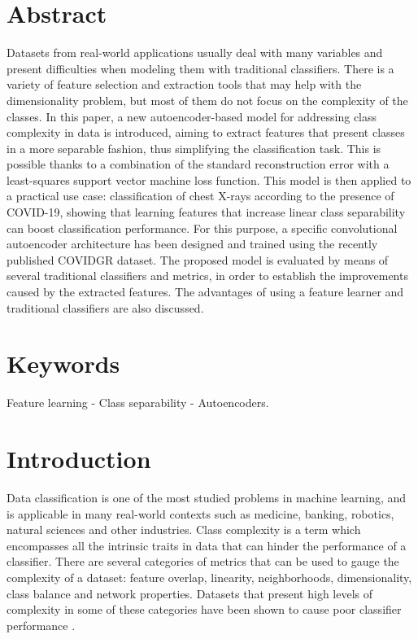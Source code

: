 \documentclass[
	fontsize=11pt, %
	twoside=false, %
	open=any, %
	secnumdepth=1, %
]{kaobook}
\begin{document}
\section*{Abstract} %
Datasets from real-world applications usually deal with many variables and present
difficulties when modeling them with traditional classifiers. There is a variety of feature
selection and extraction tools that may help with the dimensionality problem, but most of them
do not focus on the complexity of the classes. In this paper, a new autoencoder-based model
for addressing class complexity in data is introduced, aiming to extract features that present
classes in a more separable fashion, thus simplifying the classification task. This is possible thanks to a combination of the standard reconstruction error with a least-squares support vector machine loss function. This model is
then applied to a practical use case: classification of chest X-rays according to the presence
of COVID-19, showing that learning features that increase linear class separability can boost classification performance. For this purpose, a specific convolutional autoencoder architecture has been designed and trained using the recently published COVIDGR dataset. The proposed model is evaluated by means of several traditional classifiers and metrics, in order to establish the improvements caused by the extracted features. The advantages of using a feature learner and traditional classifiers are also discussed.
\section*{Keywords}Feature learning  - Class separability - Autoencoders.

\section{Introduction}\label{sec.intro}

Data classification \cite{Aggarwal2015} is one of the most studied problems in machine learning, and is applicable in many real-world contexts such as medicine, banking, robotics, natural sciences and other industries. Class complexity \cite{pascual2021revisiting,basu2006data} is a term which encompasses all the intrinsic traits in data that can hinder the performance of a classifier. There are several categories of metrics that can be used to gauge the complexity of a dataset: feature overlap, linearity, neighborhoods, dimensionality, class balance and network properties. Datasets that present high levels of complexity in some of these categories have been shown to cause poor classifier performance \cite{luengo2011addressing}.
\end{document}
